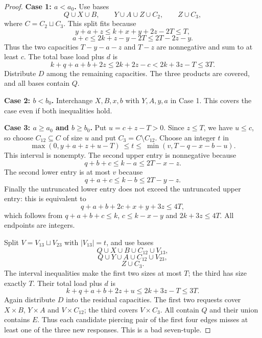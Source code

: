 \begin{proof}
\textbf{Case 1: $a<a_0$.} Use bases
\[
Q\cup X\cup B,\qquad Y\cup A\cup Z\cup C_2,\qquad Z\cup C_3,
\]
where $C=C_2\sqcup C_3$. This split fits because
\[
y+a+z\le k+x+y+2z-2T\le T,
\]
\[
a+c\le2k+z-y-2T\le2T-2z-y.
\]
Thus the two capacities $T-y-a-z$ and $T-z$ are nonnegative and sum to at least $c$. The total base load plus $d$ is
\[
k+q+a+b+2z\le2k+2z-c<2k+3z-T\le3T.
\]
Distribute $D$ among the remaining capacities. The three products are covered, and all bases contain $Q$.

\textbf{Case 2: $b<b_0$.} Interchange $X,B,x,b$ with $Y,A,y,a$ in Case 1. This covers the case even if both inequalities hold.

\textbf{Case 3: $a\ge a_0$ and $b\ge b_0$.} Put $u=c+z-T>0$. Since $z\le T$, we have $u\le c$, so choose $C_{12}\subseteq C$ of size $u$ and put $C_3=C\setminus C_{12}$. Choose an integer $t$ in
\[
\max(0,y+a+z+u-T)\ \le t\le\ \min(v,T-q-x-b-u).
\]
This interval is nonempty. The second upper entry is nonnegative because
\[
q+b+c\le k-a\le2T-x-z.
\]
The second lower entry is at most $v$ because
\[
q+a+c\le k-b\le2T-y-z.
\]
Finally the untruncated lower entry does not exceed the untruncated upper entry: this is equivalent to
\[
q+a+b+2c+x+y+3z\le4T,
\]
which follows from $q+a+b+c\le k$, $c\le k-x-y$ and $2k+3z\le4T$. All endpoints are integers.

Split $V=V_{13}\sqcup V_{23}$ with $|V_{13}|=t$, and use bases
\[
Q\cup X\cup B\cup C_{12}\cup V_{13},
\]
\[
Q\cup Y\cup A\cup C_{12}\cup V_{23},
\]
\[
Z\cup C_3.
\]
The interval inequalities make the first two sizes at most $T$; the third has size exactly $T$. Their total load plus $d$ is
\[
k+q+a+b+2z+u\le2k+3z-T\le3T.
\]
Again distribute $D$ into the residual capacities. The first two requests cover $X\times B$, $Y\times A$ and $V\times C_{12}$; the third covers $V\times C_3$. All contain $Q$ and their union contains $E$. Thus each candidate piercing pair of the first four edges misses at least one of the three new responses. This is a bad seven-tuple.
\end{proof}

